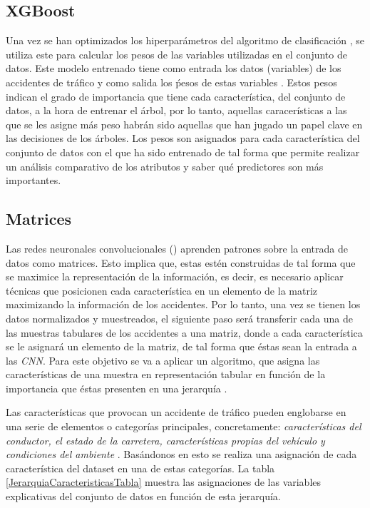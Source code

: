     \subsection{XGBoost}


        Una vez se han optimizados los hiperparámetros del algoritmo de clasificación , se utiliza este para calcular los pesos de las variables utilizadas en el conjunto de datos. Este modelo entrenado tiene como entrada los datos (variables) de los accidentes de tráfico y como salida los ṕesos de estas variables \cite{XGBoostFeatureWeightsMeaning}. Estos pesos indican el grado de importancia que tiene cada característica, del conjunto de datos, a la hora de entrenar el árbol, por lo tanto, aquellas caracerísticas a las que se les asigne más peso habrán sido aquellas que han jugado un papel clave en las decisiones de los árboles. Los pesos son asignados para cada característica del conjunto de datos con el que ha sido entrenado  de tal forma que permite realizar un análisis comparativo de los atributos y saber qué predictores son más importantes.


    \subsection{Matrices}


        Las redes neuronales convolucionales () aprenden patrones sobre la entrada de datos como matrices. Esto implica que, estas estén construidas de tal forma que se maximice la representación de la información, es decir, es necesario aplicar técnicas que posicionen cada característica en un elemento de la matriz maximizando la información de los accidentes. Por lo tanto, una vez se tienen los datos normalizados y muestreados, el siguiente paso será transferir cada una de las muestras tabulares de los accidentes a una matriz, donde a cada característica se le asignará un elemento de la matriz, de tal forma que éstas sean la entrada a las \textit{CNN}. Para este objetivo se va a aplicar un algoritmo, que asigna las características de una muestra en representación tabular en función de la importancia que éstas presenten en una jerarquía \cite{TASPCNN}.

        Las características que provocan un accidente de tráfico pueden englobarse en una serie de elementos o categorías principales, concretamente: \textit{características del conductor, el estado de la carretera, características propias del vehículo y condiciones del ambiente} \cite{JerarquiaImagenes}. Basándonos en esto se realiza una asignación de cada característica del dataset en una de estas categorías. La tabla \eqref{JerarquiaCaracteristicasTabla} muestra las asignaciones de las variables explicativas del conjunto de datos en función de esta jerarquía.


